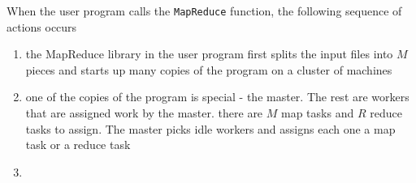 \documentclass[11pt]{article}
\begin{document}
When the user program calls the \texttt{MapReduce} function, the following sequence of actions occurs
\begin{enumerate}
\item the MapReduce library in the user program first splits the input files into \(M\) pieces and
starts up many copies of the program on a cluster of machines
\item one of the copies of the program is special - the master. The rest are workers that are
assigned work by the master. there are \(M\) map tasks and \(R\) reduce tasks to assign. The
master picks idle workers and assigns each one a map task or a reduce task
\item 
\end{enumerate}
\end{document}
